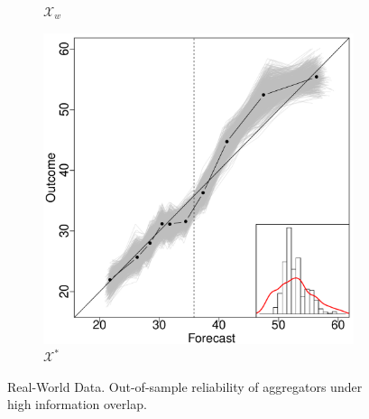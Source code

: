 \documentclass[12pt]{article}
\theoremstyle{definition}
\theoremstyle{definition}
\begin{document}
\begin{figure}[t]
\begin{subfigure}[b]{0.323\textwidth}
                \caption{$\mathcal{X}_w$}
                \label{fig:gull}
        \end{subfigure}%
        \begin{subfigure}[b]{0.323\textwidth}
                \includegraphics[width=\textwidth]{DependentE-OLP.pdf}
                \caption{$\mathcal{X}^*$}
                \label{DepEOLPConrete}
        \end{subfigure}
          \caption{Real-World Data. Out-of-sample reliability of aggregators under high information overlap. }
               \label{RelDiagramHigh}
\end{figure}
\end{document}
